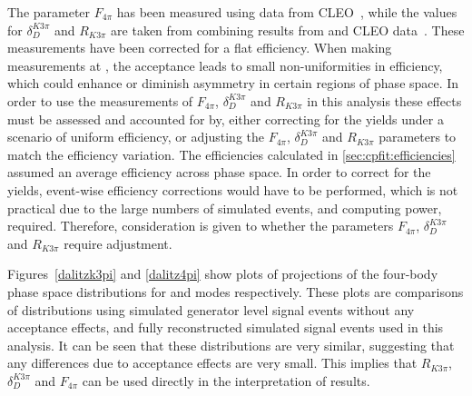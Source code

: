 The parameter $F_{4\pi}$ has been measured using data from CLEO~\cite{charm4pi}, while the values for $\delta_D^{K3\pi}$ and $R_{K3\pi}$ are taken from combining results from \lhcb and CLEO data~\cite{charmk3pi,charmk3pi_errata,LHCb-PAPER-2015-057}. These measurements have been corrected for a flat efficiency. When making measurements at \lhcb, the \lhcb acceptance leads to small non-uniformities in efficiency, which could enhance or diminish asymmetry in certain regions of phase space. In order to use the measurements of $F_{4\pi}$, $\delta_D^{K3\pi}$ and $R_{K3\pi}$ in this analysis these effects must be assessed and accounted for by, either correcting for the \lhcb yields under a scenario of uniform efficiency, or adjusting the $F_{4\pi}$, $\delta_D^{K3\pi}$ and $R_{K3\pi}$ parameters to match the \lhcb efficiency variation. The efficiencies calculated in \sect\ref{sec:cpfit:efficiencies} assumed an average efficiency across phase space. In order to correct for the \lhcb yields, event-wise efficiency corrections would have to be performed, which is not practical due to the large numbers of simulated events, and computing power, required. Therefore, consideration is given to whether the parameters $F_{4\pi}$, $\delta_D^{K3\pi}$ and $R_{K3\pi}$ require adjustment.

Figures~\ref{dalitzk3pi} and \ref{dalitz4pi} show plots of projections of the four-body phase space distributions for \kpipipi and \pipipipi modes respectively. These plots are comparisons of distributions using simulated generator level signal events without any acceptance effects, and fully reconstructed simulated signal events used in this analysis. It can be seen that these distributions are very similar, suggesting that any differences due to \lhcb acceptance effects are very small. This implies that $R_{K3\pi}$, $\delta_D^{K3\pi}$ and $F_{4\pi}$ can be used directly in the interpretation of \lhcb results.


